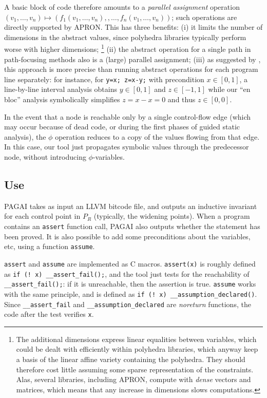 \documentclass{entcs}
\begin{document}
A basic block of code therefore amounts to a \emph{parallel assignment} operation
$(v_1,\dots,v_n) \allowbreak\mapsto\allowbreak
(f_1(v_1,\dots,v_n), \allowbreak, \dots, \allowbreak
 f_n(v_1,\dots,v_n))$;
such operations are directly supported by APRON. This has three benefits:
(i) it limits the number of dimensions in the abstract values, since polyhedra libraries typically perform worse with higher dimensions;%
\footnote{The additional dimensions express linear equalities between variables, which could be dealt with efficiently within polyhedra libraries, which anyway keep a basis of the linear affine variety containing the polyhedra.
They should therefore cost little assuming some sparse representation of the constraints.
Alas, several libraries, including APRON, compute with \emph{dense} vectors and matrices, which means that any increase in dimensions slows computations.}
(ii) the abstract operation for a single path in path-focusing methods also is a (large) parallel assignment;
(iii) as suggested by \citet{DBLP:conf/vmcai/Mine06}, this approach is more precise than running abstract operations for each program line separately:
for instance, for \lstinline|y=x; z=x-y;| with precondition $x \in [0,1]$, a line-by-line interval analysis obtains $y \in [0,1]$ and $z \in [-1,1]$ while our ``en bloc'' analysis symbolically simplifies $z = x - x = 0$ and thus $z \in [0,0]$.

In the event that a node is reachable only by a single control-flow edge (which may occur because of dead code, or during the first phases of guided static analysis), the $\phi$ operation reduces to a copy of the values flowing from that edge. In this case, our tool just propagates symbolic values through the predecessor node, without introducing $\phi$-variables.


\subsection{Use}

PAGAI takes as input an LLVM bitcode file, and outputs an inductive invariant
for each control point in $P_R$ (typically, the widening points).
When a program contains an \lstinline|assert| function call, PAGAI also outputs whether
the statement has been proved.
It is also possible to add some preconditions about the variables, etc, using a
function \lstinline|assume|.

\lstinline|assert| and \lstinline|assume| are implemented as C macros.
\lstinline|assert(x)| is roughly defined as \lstinline|if (! x) __assert_fail();|, and the tool just tests for the reachability of \lstinline|__assert_fail();|: if it is unreachable, then the assertion is true.
\lstinline|assume| works with the same principle, and is defined as \lstinline|if (! x) __assumption_declared()|. Since \lstinline|__assert_fail| and
\lstinline|__assumption_declared| are \emph{noreturn} functions, the code after
the test verifies \lstinline|x|.
\end{document}
